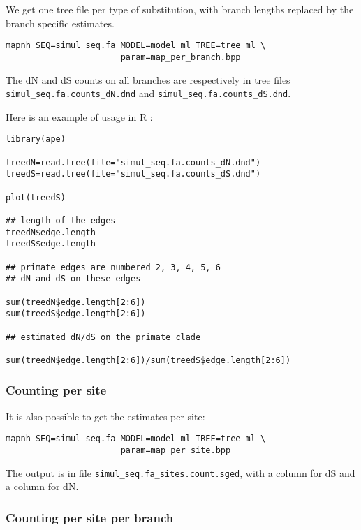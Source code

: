 \documentclass[11pt, a4paper]{article}
\begin{document}
We get one tree file per type of substitution, with branch lengths
replaced by the branch specific estimates.

\begin{verbatim}
mapnh SEQ=simul_seq.fa MODEL=model_ml TREE=tree_ml \
                       param=map_per_branch.bpp
\end{verbatim}

The dN and dS counts on all branches are respectively in tree files
\\ 
\verb|simul_seq.fa.counts_dN.dnd| and
\verb|simul_seq.fa.counts_dS.dnd|.

\smallskip

Here is an example of usage in R :

\begin{verbatim}
library(ape)

treedN=read.tree(file="simul_seq.fa.counts_dN.dnd")  
treedS=read.tree(file="simul_seq.fa.counts_dS.dnd")  

plot(treedS)

## length of the edges 
treedN$edge.length
treedS$edge.length

## primate edges are numbered 2, 3, 4, 5, 6
## dN and dS on these edges

sum(treedN$edge.length[2:6])
sum(treedS$edge.length[2:6])

## estimated dN/dS on the primate clade

sum(treedN$edge.length[2:6])/sum(treedS$edge.length[2:6])

\end{verbatim}


\subsubsection*{Counting per site}

It is also possible to get the estimates per site:

\begin{verbatim}
mapnh SEQ=simul_seq.fa MODEL=model_ml TREE=tree_ml \
                       param=map_per_site.bpp
\end{verbatim}


The output is in file \verb|simul_seq.fa_sites.count.sged|, with a column
for dS and a column for dN.

\subsubsection*{Counting per site per branch}
\end{document}
